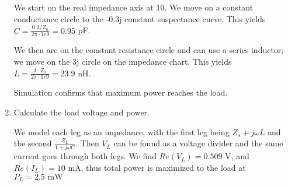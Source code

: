 \begin{enumerate}[label=(\alph*)]
    We start on the real impedance axis at 10. We move on a constant conductance circle to the -0.3j constant suspectance curve.
    This yields $C = \frac{0.3 / Z_0}{2 \pi \cdot 1e9} = 0.95$ pF.

    We then are on the constant resistance circle and can use a series inductor; we move on the 3j circle on the impedance chart.
    This yields $L = \frac{3 \cdot Z_0}{2 \pi \cdot 1e9} = 23.9$ nH.

    Simulation confirms that maximum power reaches the load.

    \item Calculate the load voltage and power.

        We model each leg as an impedance, with the first leg being $Z_s + j \omega L$ and the second $\frac{Z_L}{1 + j\omega C}$. Then $V_L$ can be found as a voltage divider and the same current goes through both legs. We find $Re(V_L) = 0.509 \text{ V}$, and $Re(I_L) = 10 \text{ mA}$, thus total power is maximized to the load at $P_L = 2.5 \text{ mW}$
\end{enumerate}

